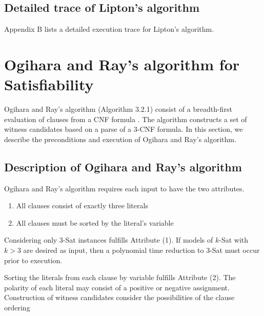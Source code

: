 	\subsection{Detailed trace of Lipton's algorithm}
	
Appendix B lists a detailed execution trace for Lipton's algorithm.


\section{Ogihara and Ray's algorithm for {\sc Satisfiability}}


Ogihara and Ray's algorithm (Algorithm 3.2.1) consist of a breadth-first evaluation of clauses from a CNF formula \cite{Ogihara:1996:BFS:898228,Ogihara97dna-basedparallel}.  The algorithm constructs a set of witness candidates based on a parse of a 3-CNF formula.  In this section, we describe the preconditions and execution of Ogihara and Ray's algorithm.


\FloatBarrier

\subsection{Description of Ogihara and Ray's algorithm}
		
Ogihara and Ray's algorithm requires each input to have the two attributes.

\begin{enumerate}
\item All clauses consist of exactly three literals
\item All clauses must be sorted by the literal's variable
\end{enumerate}

Considering only $3$-{\sc Sat} instances fulfills Attribute (1).  If models of $k$-{\sc Sat} with $k > 3$ are desired as input, then a polynomial time reduction to $3$-{\sc Sat} must occur prior to execution.

Sorting the literals from each clause by variable fulfills Attribute (2).  The polarity of each literal may consist of a positive or negative assignment.  Construction of witness candidates consider the possibilities of the clause ordering

